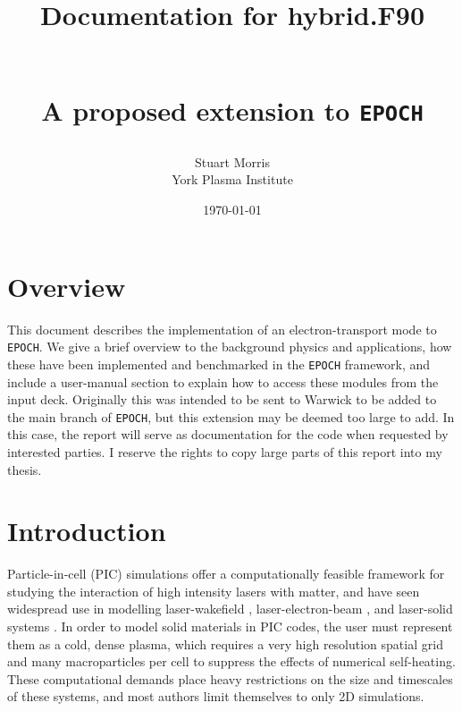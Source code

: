 \documentclass[12pt]{article}
\numberwithin{equation}{section}
\begin{document}
\title{\begin{huge}Documentation for hybrid.F90\end{huge}
\\A proposed extension to \texttt{EPOCH}}
\author{Stuart Morris\\York Plasma Institute}%
\date{\today}
\maketitle

\vfill
\section*{Overview}
This document describes the implementation of an electron-transport mode to \texttt{EPOCH}. We give a brief overview to the background physics and applications, how these have been implemented and benchmarked in the \texttt{EPOCH} framework, and include a user-manual section to explain how to access these modules from the input deck. Originally this was intended to be sent to Warwick to be added to the main branch of \texttt{EPOCH}, but this extension may be deemed too large to add. In this case, the report will serve as documentation for the code when requested by interested parties. I reserve the rights to copy large parts of this report into my thesis.\\


\pagebreak

\tableofcontents

\pagebreak

\section{Introduction} \label{sec:intro}

Particle-in-cell (PIC) simulations offer a computationally feasible framework for studying the interaction of high intensity lasers with matter, and have seen widespread use in modelling laser-wakefield \cite{intro:wakefield}, laser-electron-beam \cite{intro:electron_beam}, and laser-solid systems \cite{bremPIC:Vyskocil, bremPIC:Wu, bremPIC:Wan}. In order to model solid materials in PIC codes, the user must represent them as a cold, dense plasma, which requires a very high resolution spatial grid and many macroparticles per cell to suppress the effects of numerical self-heating. These computational demands place heavy restrictions on the size and timescales  
of these systems, and most authors limit themselves to only 2D simulations.
\end{document}
